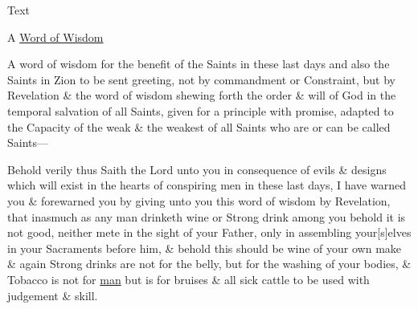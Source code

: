 			
			\begin{description}
				\item[Text]
			\end{description}
			
				\begin{tightcenter}
					A \uline{Word of Wisdom}
				\end{tightcenter}
				
				A word of wisdom for the benefit of the Saints in these last days and also the Saints in Zion to be sent greeting, not by commandment or Constraint, but by Revelation \& the word of wisdom shewing forth the order \& will of God in the temporal salvation of all Saints, given for a principle with promise, adapted to the Capacity of the weak \& the weakest of all Saints who are or can be called Saints---
				
				Behold verily thus Saith the Lord unto you in consequence of evils \& designs which will exist in the hearts of conspiring men in these last days, I have warned you \& forewarned you by giving unto you this word of wisdom by Revelation, that inasmuch as any man drinketh wine or Strong drink among you behold it is not good, neither mete in the sight of your Father, only in assembling your[s]elves in your Sacraments before him, \& behold this should be wine of your own make \& again Strong drinks are not for the belly, but for the washing of your bodies, \& Tobacco is not for \uline{man} but is for bruises \& all sick cattle to be used with judgement \& skill.
				
